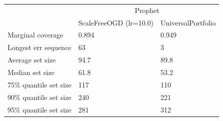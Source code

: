 \begin{tabular}{lll}
\toprule
& \multicolumn{2}{c}{Prophet} \\
& ScaleFreeOGD (lr=10.0) & UniversalPortfolio \\
\midrule
Marginal coverage & 0.894 & 0.949 \\
Longest err sequence & 63 & 3 \\
Average set size & 94.7 & 89.8 \\
Median set size & 61.8 & 53.2 \\
75\% quantile set size & 117 & 110 \\
90\% quantile set size & 240 & 221 \\
95\% quantile set size & 281 & 312 \\
\bottomrule
\end{tabular}

